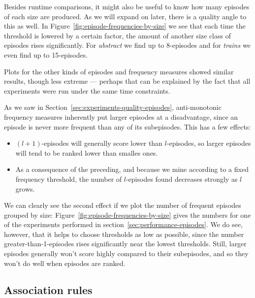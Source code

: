 Besides runtime comparisons, it might also be useful to know how many episodes of each size are produced. As we will expand on later, there is a quality angle to this as well. In Figure~\ref{fig:episode-frequencies-by-size} we see that each time the threshold is lowered by a certain factor, the amount of another size class of episodes rises significantly. For \emph{abstract} we find up to 8-episodes and for \emph{trains} we even find up to 15-episodes.

Plots for the other kinds of episodes and frequency measures showed similar results, though less extreme --- perhaps that can be explained by the fact that all experiments were run under the same time constraints.

As we saw in Section~\ref{sec:experiments-quality-episodes}, anti-monotonic frequency measures inherently put larger episodes at a disadvantage, since an episode is never more frequent than any of its subepisodes. This has a few effects:
\begin{itemize}
\item $ (l + 1) $-episodes will generally score lower than $ l $-episodes, so larger episodes will tend to be ranked lower than smalles ones.
\item As a consequence of the preceding, and because we mine according to a fixed frequency threshold, the number of $ l $-episodes found decreases strongly as $ l $ grows.
\end{itemize}
We can clearly see the second effect if we plot the number of frequent episodes grouped by size: Figure~\ref{fig:episode-frequencies-by-size} gives the numbers for one of the experiments performed in section~\ref{sec:performance-episodes}. We do see, however, that it helps to choose thresholds as low as possible, since the number greater-than-1-episodes rises significantly near the lowest thresholds. Still, larger episodes generally won't score highly compared to their subepisodes, and so they won't do well when episodes are ranked.

\subsection{Association rules}

